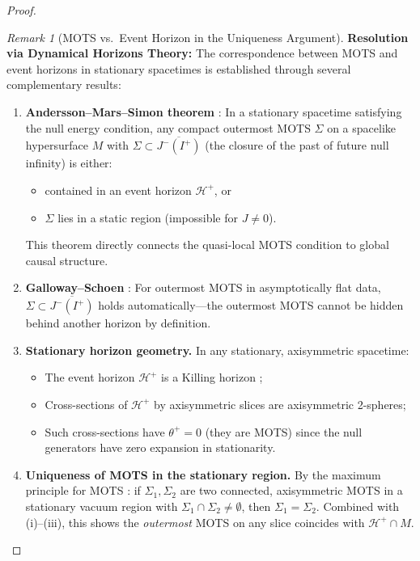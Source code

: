 \documentclass[12pt]{article}
\theoremstyle{plain}
\theoremstyle{definition}
\theoremstyle{remark}
\newtheorem{remark}[theorem]{Remark}
\begin{document}
\begin{proof}
\begin{remark}[MOTS vs.\ Event Horizon in the Uniqueness Argument]
\textbf{Resolution via Dynamical Horizons Theory:} The correspondence between MOTS and event horizons in stationary spacetimes is established through several complementary results:

\begin{enumerate}
    \item[(i)] \textbf{Andersson--Mars--Simon theorem} \cite[Theorem 3.1]{anderssonmarssimonfaller2008}: In a stationary spacetime satisfying the null energy condition, any compact outermost MOTS $\Sigma$ on a spacelike hypersurface $M$ with $\Sigma \subset \overline{J^-(I^+)}$ (the closure of the past of future null infinity) is either:
    \begin{itemize}
        \item contained in an event horizon $\mathcal{H}^+$, or
        \item $\Sigma$ lies in a static region (impossible for $J \neq 0$).
    \end{itemize}
    This theorem directly connects the quasi-local MOTS condition to global causal structure.
    
    \item[(ii)] \textbf{Galloway--Schoen} \cite[Proposition 2.1]{gallowayschoen2006}: For outermost MOTS in asymptotically flat data, $\Sigma \subset \overline{J^-(I^+)}$ holds automatically---the outermost MOTS cannot be hidden behind another horizon by definition.
    
    \item[(iii)] \textbf{Stationary horizon geometry.} In any stationary, axisymmetric spacetime:
    \begin{itemize}
        \item The event horizon $\mathcal{H}^+$ is a Killing horizon \cite[Section 12.3]{wald1984};
        \item Cross-sections of $\mathcal{H}^+$ by axisymmetric slices are axisymmetric 2-spheres;
        \item Such cross-sections have $\theta^+ = 0$ (they are MOTS) since the null generators have zero expansion in stationarity.
    \end{itemize}
    
    \item[(iv)] \textbf{Uniqueness of MOTS in the stationary region.} By the maximum principle for MOTS \cite[Theorem 1]{anderssonmars2007}: if $\Sigma_1, \Sigma_2$ are two connected, axisymmetric MOTS in a stationary vacuum region with $\Sigma_1 \cap \Sigma_2 \neq \emptyset$, then $\Sigma_1 = \Sigma_2$. Combined with (i)--(iii), this shows the \emph{outermost} MOTS on any slice coincides with $\mathcal{H}^+ \cap M$.
\end{enumerate}


\end{remark}
\end{proof}
\end{document}
